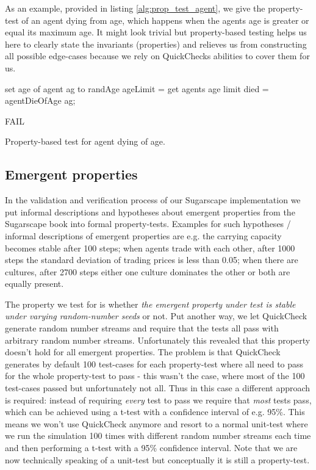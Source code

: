 As an example, provided in listing \ref{alg:prop_test_agent}, we give the property-test of an agent dying from age, which happens when the agents age is greater or equal its maximum age. It might look trivial but property-based testing helps us here to clearly state the invariants (properties) and relieves us from constructing all possible edge-cases because we rely on QuickChecks abilities to cover them for us.

\begin{algorithm}
set age of agent ag to randAge\;
ageLimit = get agents age limit\; 
died = agentDieOfAge ag;\

 {
  FAIL\;
}
\caption{Property-based test for agent dying of age.}
\end{algorithm}
\label{alg:prop_test_agent}

\subsection{Emergent properties}
In the validation and verification process of our Sugarscape implementation we put informal descriptions and hypotheses about emergent properties from the Sugarscape book into formal property-tests. Examples for such hypotheses / informal descriptions of emergent properties are e.g. the carrying capacity becomes stable after 100 steps; when agents trade with each other, after 1000 steps the standard deviation of trading prices is less than 0.05; when there are cultures, after 2700 steps either one culture dominates the other or both are equally present.

The property we test for is whether \textit{the emergent property under test is stable under varying random-number seeds} or not. Put another way, we let QuickCheck generate random number streams and require that the tests all pass with arbitrary random number streams. Unfortunately this revealed that this property doesn't hold for all emergent properties. The problem is that QuickCheck generates by default 100 test-cases for each property-test where all need to pass for the whole property-test to pass - this wasn't the case, where most of the 100 test-cases passed but unfortunately not all. Thus in this case a different approach is required: instead of requiring \textit{every} test to pass we require that \textit{most} tests pass, which can be achieved using a t-test with a confidence interval of e.g. 95\%. This means we won't use QuickCheck anymore and resort to a normal unit-test where we run the simulation 100 times with different random number streams each time and then performing a t-test with a 95\% confidence interval. Note that we are now technically speaking of a unit-test but conceptually it is still a property-test.

